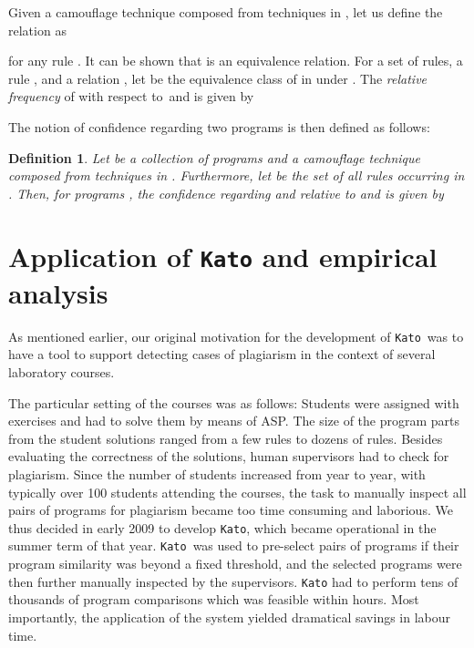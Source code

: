 \documentclass{tlp}
\newcommand{\wrt}[0]{with respect to}
\newcommand{\kato}[0]{\texttt{Kato}\xspace}
\newtheorem{definition}{Definition}
\begin{document}
Given a camouflage technique    composed from techniques in , let us
define the  relation  as 

for any rule .
It can be shown that   is an equivalence relation.
For a set  of rules, a rule , and a relation  , let  be the  equivalence class of 
 in  under .
The \emph{relative frequency} of  \wrt\  and  is given by 

The notion of confidence regarding two programs is then defined as
follows:

\begin{definition}\label{def:confidence}
Let  be a collection of programs and  a camouflage technique   composed from techniques in .
Furthermore, let  be the set of all rules occurring in .
Then, for programs ,
the \emph{confidence regarding  and  relative to  and } is given by

\end{definition}

\section{Application of \kato and empirical analysis}\label{sec:eval}


As mentioned earlier, our original motivation for the development of \kato\ was to have a tool to support detecting cases of plagiarism in the context of several laboratory courses.

The particular setting of the courses was as follows:
Students were assigned with exercises and had to solve them 
 by means of ASP. The size of the program parts from the student solutions ranged from a few rules to dozens of rules.
Besides evaluating the correctness of the solutions, human supervisors had
to check for plagiarism. 
Since the number of students increased from year to year, with typically over 100 students attending the courses, 
the task to manually inspect all pairs of programs for plagiarism became too time consuming and laborious.
We thus decided in early 2009 to develop \kato, which became 
operational in the summer term of that year.
 \kato\ was used to pre-select pairs of programs if their program similarity was beyond a fixed threshold, and the selected programs were then further manually inspected by the supervisors. 
\kato had to perform tens of thousands of program comparisons 
which was feasible within 
hours.
Most importantly, the application of the system yielded dramatical savings in labour time.
\end{document}

